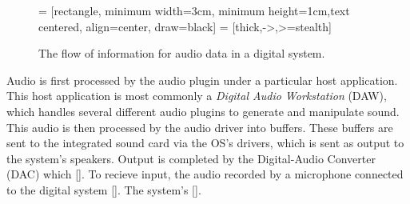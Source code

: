 \begin{figure}[h] %
	 = [rectangle, minimum width=3cm, minimum height=1cm,text centered, align=center, draw=black]
	 = [thick,->,>=stealth]
	\begin{center}
		\caption{The flow of information for audio data in a digital system.}
	\end{center}
\end{figure}

Audio is first processed by the audio plugin under a particular host application. This host application is most commonly a \textit{Digital Audio Workstation} (DAW), which handles several different audio plugins to generate and manipulate sound. This audio is then processed by the audio driver into buffers. These buffers are sent to the integrated sound card via the OS's drivers, which is sent as output to the system's speakers. Output is completed by the Digital-Audio Converter (DAC) which []. To recieve input, the audio recorded by a microphone connected to the digital system []. The system's [].

